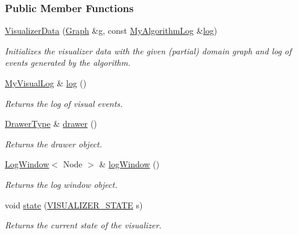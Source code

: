 \subsubsection*{Public Member Functions}
\begin{DoxyCompactItemize}
\item 
\hyperlink{structVisualizerData_abcb7ef824e6a9d09917bfac4351a9d8b}{Visualizer\+Data} (\hyperlink{structVisualizerData_a22f7b99d8e45a9bcc56771efd611f5e3}{Graph} \&g, const \hyperlink{structVisualizerData_a7e068bb878ca92434a498e72717c8800}{My\+Algorithm\+Log} \&\hyperlink{structVisualizerData_ad1018340c60e3eda3e7aa40dfd94e22d}{log})\hypertarget{structVisualizerData_abcb7ef824e6a9d09917bfac4351a9d8b}{}\label{structVisualizerData_abcb7ef824e6a9d09917bfac4351a9d8b}

\begin{DoxyCompactList}\small\item\em Initializes the visualizer data with the given (partial) domain graph and log of events generated by the algorithm. \end{DoxyCompactList}\item 
\hyperlink{structVisualizerData_a6cd4b3f0a572ec341c19cb0c0dc3751a}{My\+Visual\+Log} \& \hyperlink{structVisualizerData_ad1018340c60e3eda3e7aa40dfd94e22d}{log} ()
\begin{DoxyCompactList}\small\item\em Returns the log of visual events. \end{DoxyCompactList}\item 
\hyperlink{structVisualizerData_ae68cf5e12f7a5c784c906194ca822f05}{Drawer\+Type} \& \hyperlink{structVisualizerData_ac122fafd0f73f53d6818111165f48f28}{drawer} ()
\begin{DoxyCompactList}\small\item\em Returns the drawer object. \end{DoxyCompactList}\item 
\hyperlink{structLogWindow}{Log\+Window}$<$ Node $>$ \& \hyperlink{structVisualizerData_ad28adfa25bf7ba57f020ed6ffba1fdfb}{log\+Window} ()
\begin{DoxyCompactList}\small\item\em Returns the log window object. \end{DoxyCompactList}\item 
void \hyperlink{structVisualizerData_a53fb3f697bd2e97750fe8abbcab6fd59}{state} (\hyperlink{structVisualizerData_a2384b80db05920ce2bdddab4fad53a47}{V\+I\+S\+U\+A\+L\+I\+Z\+E\+R\+\_\+\+S\+T\+A\+TE} s)
\begin{DoxyCompactList}\small\item\em Returns the current state of the visualizer. \end{DoxyCompactList}\item 

\end{DoxyCompactItemize}

